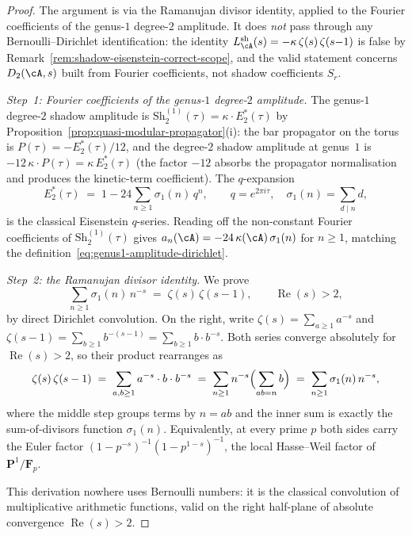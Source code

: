 \begin{proof}
The argument is via the Ramanujan divisor identity,
applied to the Fourier coefficients of the genus-$1$
degree-$2$ amplitude. It does \emph{not} pass through any
Bernoulli--Dirichlet identification: the identity
$L_\cA^{\mathrm{sh}}(s) = -\kappa\,\zeta(s)\,\zeta(s{-}1)$
is false by Remark~\ref{rem:shadow-eisenstein-correct-scope}, and
the valid statement concerns $D_2(\cA, s)$ built from Fourier
coefficients, not shadow coefficients $S_r$.

\emph{Step~1: Fourier coefficients of the genus-$1$
degree-$2$ amplitude.}
The genus-$1$ degree-$2$ shadow amplitude is
$\mathrm{Sh}_2^{(1)}(\tau) = \kappa \cdot E_2^*(\tau)$
by Proposition~\ref{prop:quasi-modular-propagator}(i): the
bar propagator on the torus is
$P(\tau) = -E_2^*(\tau)/12$, and the degree-$2$ shadow
amplitude at genus~$1$ is $-12\,\kappa\cdot P(\tau)
= \kappa\,E_2^*(\tau)$ (the factor $-12$ absorbs the
propagator normalisation and produces the kinetic-term
coefficient). The $q$-expansion
\[
 E_2^*(\tau)
 \;=\;
 1 - 24\sum_{n \ge 1}\sigma_1(n)\,q^n,
 \qquad
 q = e^{2\pi i \tau},\quad
 \sigma_1(n) = \sum_{d \mid n} d,
\]
is the classical Eisenstein $q$-series. Reading off
the non-constant Fourier coefficients of
$\mathrm{Sh}_2^{(1)}(\tau)$ gives
$a_n(\cA) = -24\,\kappa(\cA)\,\sigma_1(n)$ for $n \ge 1$,
matching the definition~\eqref{eq:genus1-amplitude-dirichlet}.

\emph{Step~2: the Ramanujan divisor identity.}
We prove
\begin{equation}\label{eq:divisor-dirichlet-identity}
 \sum_{n \ge 1} \sigma_1(n)\,n^{-s}
 \;=\;
 \zeta(s)\,\zeta(s-1),
 \qquad \operatorname{Re}(s) > 2,
\end{equation}
by direct Dirichlet convolution. On the right, write
$\zeta(s) = \sum_{a \ge 1} a^{-s}$ and
$\zeta(s{-}1) = \sum_{b \ge 1} b^{-(s-1)}
= \sum_{b \ge 1} b \cdot b^{-s}$.
Both series converge absolutely for
$\operatorname{Re}(s) > 2$, so their product rearranges as
\[
 \zeta(s)\,\zeta(s-1)
 \;=\;
 \sum_{a,b \ge 1} a^{-s} \cdot b \cdot b^{-s}
 \;=\;
 \sum_{n \ge 1} n^{-s} \Bigl(\sum_{ab = n} b\Bigr)
 \;=\;
 \sum_{n \ge 1} \sigma_1(n)\,n^{-s},
\]
where the middle step groups terms by $n = ab$ and the
inner sum is exactly the sum-of-divisors function
$\sigma_1(n)$. Equivalently, at every prime $p$ both
sides carry the Euler factor
$(1 - p^{-s})^{-1}(1 - p^{1-s})^{-1}$, the local
Hasse--Weil factor of $\mathbf{P}^1/\mathbf{F}_p$.

This derivation nowhere uses Bernoulli numbers: it is the
classical convolution of multiplicative arithmetic
functions, valid on the right half-plane of absolute
convergence $\operatorname{Re}(s) > 2$.


\end{proof}
